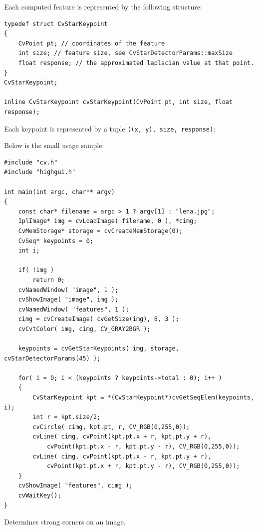 \ifC
Each computed feature is represented by the following structure:

\begin{lstlisting}
typedef struct CvStarKeypoint
{
    CvPoint pt; // coordinates of the feature
    int size; // feature size, see CvStarDetectorParams::maxSize
    float response; // the approximated laplacian value at that point.
}
CvStarKeypoint;

inline CvStarKeypoint cvStarKeypoint(CvPoint pt, int size, float response);
\end{lstlisting}
\else
Each keypoint is represented by a tuple \texttt{((x, y), size, response)}:
\begin{description}
\end{description}
\fi

\ifC
Below is the small usage sample:

\begin{lstlisting}
#include "cv.h"
#include "highgui.h"

int main(int argc, char** argv)
{
    const char* filename = argc > 1 ? argv[1] : "lena.jpg";
    IplImage* img = cvLoadImage( filename, 0 ), *cimg;
    CvMemStorage* storage = cvCreateMemStorage(0);
    CvSeq* keypoints = 0;
    int i;

    if( !img )
        return 0;
    cvNamedWindow( "image", 1 );
    cvShowImage( "image", img );
    cvNamedWindow( "features", 1 );
    cimg = cvCreateImage( cvGetSize(img), 8, 3 );
    cvCvtColor( img, cimg, CV_GRAY2BGR );

    keypoints = cvGetStarKeypoints( img, storage, cvStarDetectorParams(45) );

    for( i = 0; i < (keypoints ? keypoints->total : 0); i++ )
    {
        CvStarKeypoint kpt = *(CvStarKeypoint*)cvGetSeqElem(keypoints, i);
        int r = kpt.size/2;
        cvCircle( cimg, kpt.pt, r, CV_RGB(0,255,0));
        cvLine( cimg, cvPoint(kpt.pt.x + r, kpt.pt.y + r),
            cvPoint(kpt.pt.x - r, kpt.pt.y - r), CV_RGB(0,255,0));
        cvLine( cimg, cvPoint(kpt.pt.x - r, kpt.pt.y + r),
            cvPoint(kpt.pt.x + r, kpt.pt.y - r), CV_RGB(0,255,0));
    }
    cvShowImage( "features", cimg );
    cvWaitKey();
}
\end{lstlisting}
\fi

Determines strong corners on an image.

